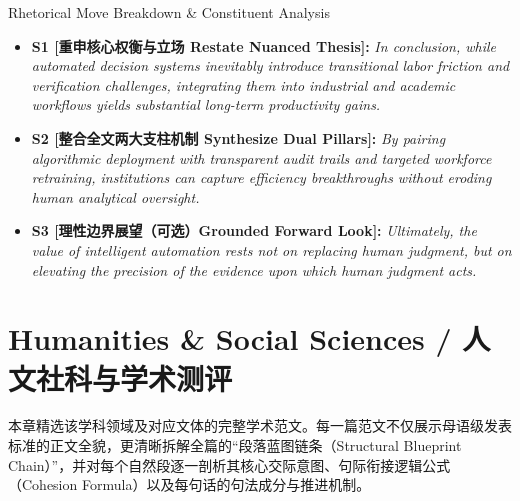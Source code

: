 \begin{TipBox}{Rhetorical Move Breakdown \& Constituent Analysis}
\begin{itemize}[leftmargin=1.5em]
  \item \textbf{S1 [重申核心权衡与立场 Restate Nuanced Thesis]:} \textit{In conclusion, while automated decision systems inevitably introduce transitional labor friction and verification challenges, integrating them into industrial and academic workflows yields substantial long-term productivity gains.}\par{}
  \item \textbf{S2 [整合全文两大支柱机制 Synthesize Dual Pillars]:} \textit{By pairing algorithmic deployment with transparent audit trails and targeted workforce retraining, institutions can capture efficiency breakthroughs without eroding human analytical oversight.}\par{}
  \item \textbf{S3 [理性边界展望（可选）Grounded Forward Look]:} \textit{Ultimately, the value of intelligent automation rests not on replacing human judgment, but on elevating the precision of the evidence upon which human judgment acts.}\par{}
\end{itemize}
\end{TipBox}
\medskip
\clearpage
\chapter{Humanities \& Social Sciences / 人文社科与学术测评}\label{ch:anthology_22}
本章精选该学科领域及对应文体的完整学术范文。每一篇范文不仅展示母语级发表标准的正文全貌，更清晰拆解全篇的“段落蓝图链条（Structural Blueprint Chain）”，并对每个自然段逐一剖析其核心交际意图、句际衔接逻辑公式（Cohesion Formula）以及每句话的句法成分与推进机制。

